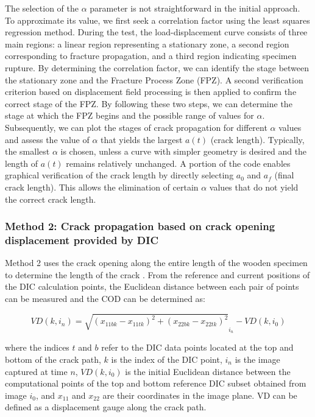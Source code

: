 \documentclass[3p,times,procedia]{elsarticle}
\begin{document}
The selection of the $\alpha$ parameter is not straightforward in the initial approach. To approximate its value, we first seek a correlation factor using the least squares regression method. During the test, the load-displacement curve consists of three main regions: a linear region representing a stationary zone, a second region corresponding to fracture propagation, and a third region indicating specimen rupture. By determining the correlation factor, we can identify the stage between the stationary zone and the Fracture Process Zone (FPZ). A second verification criterion based on displacement field processing is then applied to confirm the correct stage of the FPZ. By following these two steps, we can determine the stage at which the FPZ begins and the possible range of values for $\alpha$. Subsequently, we can plot the stages of crack propagation for different $\alpha$ values and assess the value of $\alpha$ that yields the largest $a(t)$ (crack length). Typically, the smallest $\alpha$ is chosen, unless a curve with simpler geometry is desired and the length of $a(t)$ remains relatively unchanged. A portion of the code enables graphical verification of the crack length by directly selecting $a_0$ and $a_f$ (final crack length). This allows the elimination of certain $\alpha$ values that do not yield the correct crack length.

\subsubsection{Method 2: Crack propagation based on crack opening displacement provided by DIC}

Method 2 uses the crack opening along the entire length of the wooden specimen to determine the length of the crack \citep{FilhoJ2022}. From the reference and current positions of the DIC calculation points, the Euclidean distance between each pair of points can be measured and the COD can be determined as:

\begin{equation}
	VD(k,i_n)=\sqrt{(x_{11bk}-x_{11tk})^2 + (x_{22bk}-x_{22tk})^2}_{i_n} - VD(k,i_0)
	\label{eq:eq23}
\end{equation}

\noindent where the indices $t$ and $b$ refer to the DIC data points located at the top and bottom of the crack path, $k$ is the index of the DIC point, $i_n$ is the image captured at time $n$, $VD(k, i_0)$ is the initial Euclidean distance between the computational points of the top and bottom reference DIC subset obtained from image $i_0$, and $x_{11}$ and $x_{22}$ are their coordinates in the image plane. VD can be defined as a displacement gauge along the crack path.
\end{document}
